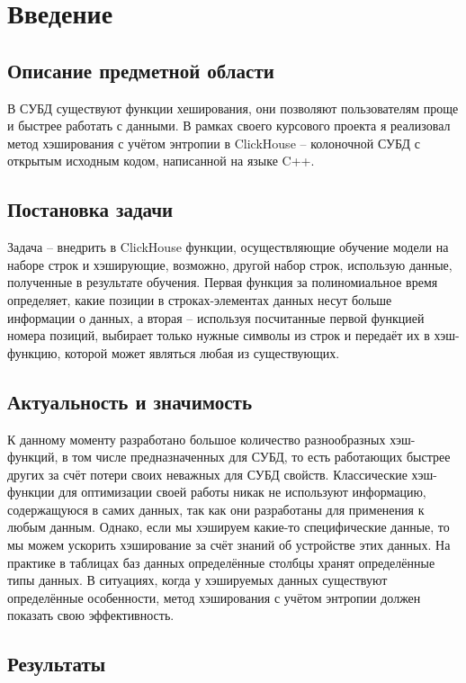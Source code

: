 \documentclass[a4paper,12pt]{extarticle}
\begin{document}
\section{Введение}
\subsection{Описание предметной области}

В СУБД существуют функции хеширования, они позволяют пользователям проще и быстрее работать с данными. В рамках своего курсового проекта я реализовал метод хэширования с учётом энтропии в ClickHouse -- колоночной СУБД с открытым исходным кодом, написанной на языке C++.

\subsection{Постановка задачи}

Задача -- внедрить в ClickHouse функции, осуществляющие обучение модели на наборе строк и хэширующие, возможно, другой набор строк, использую данные, полученные в результате обучения. Первая функция за полиномиальное время определяет, какие позиции в строках-элементах данных несут больше информации о данных, а вторая -- используя посчитанные первой функцией номера позиций, выбирает только нужные символы из строк и передаёт их в хэш-функцию, которой может являться любая из существующих.

\subsection{Актуальность и значимость}

К данному моменту разработано большое количество разнообразных хэш-функций, в том числе предназначенных для СУБД, то есть работающих быстрее других за счёт потери своих неважных для СУБД свойств. Классические хэш-функции для оптимизации своей работы никак не используют информацию, содержащуюся в самих данных, так как они разработаны для применения к любым данным. Однако, если мы хэшируем какие-то специфические данные, то мы можем ускорить хэширование за счёт знаний об устройстве этих данных. На практике в таблицах баз данных определённые столбцы хранят определённые типы данных. В ситуациях, когда у хэшируемых данных существуют определённые особенности, метод хэширования с учётом энтропии должен показать свою эффективность.

\subsection{Результаты}
\end{document}
